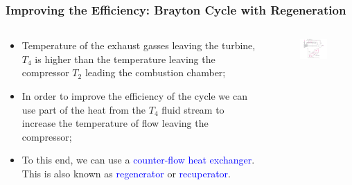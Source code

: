 \documentclass[10pt,compress]{beamer}
\begin{document}
\begin{frame}
 \frametitle{Improving the Efficiency: Brayton Cycle with Regeneration}
 \begin{columns}
  \begin{column}[c]{0.4\linewidth} 
 \begin{itemize}
  \item <1-> Temperature of the exhaust gasses leaving the turbine, $T_{4}$ is higher than the temperature leaving the compressor $T_{2}$ leading the combustion chamber;
  \item <2-> In order to improve the efficiency of the cycle we can use part of the heat from the $T_{4}$ fluid stream to increase the temperature of flow leaving the compressor;
  \item <3-> To this end, we can use a \textcolor{blue}{counter-flow heat exchanger}. This is also known as \textcolor{blue}{regenerator} or \textcolor{blue}{recuperator}.
 \end{itemize}
  \end{column}
  \begin{column}[c]{0.6\linewidth}
    \begin{center}
   \begin{figure}%
     \includegraphics[height=6.cm,width=6.5cm,clip]{./Pics/Brayton_cycle4}
   \end{figure}  
    \end{center}
  \end{column}  
 \end{columns}

\end{frame}
\end{document}
